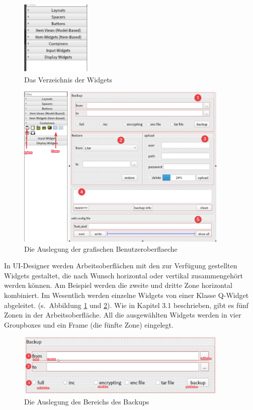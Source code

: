 \begin{figure}[h!]
	\centering
	\includegraphics[width=0.3\textwidth]{bilder/widget.png}
	\caption{Das Verzeichnis der Widgets}
	\label{Abbildung_9}
\end{figure}

\begin{figure}[h!]
	\centering
	\includegraphics[width=0.9\textwidth]{bilder/edit_ui.png}
	\caption{Die Auslegung der grafischen Benutzeroberflaeche}
	\label{Abbildung_10}
\end{figure}

In UI-Designer werden Arbeitsoberflächen mit den zur Verfügung gestellten Widgets gestaltet, die nach Wunsch horizontal oder vertikal zusammengehört werden können. Am Beispiel werden die zweite und dritte Zone horizontal kombiniert. Im Wesentlich werden einzelne Widgets von einer Klasse Q-Widget abgeleitet. (s. Abbildung \ref{Abbildung_9} und \ref{Abbildung_10}).
Wie in Kapitel 3.1 beschrieben, gibt es fünf Zonen in der Arbeitsoberfläche. All die ausgewählten Widgets werden in vier Groupboxes und ein Frame (die fünfte Zone) eingelegt.

\begin{figure}[h!]
	\centering
	\includegraphics[width=0.9\textwidth]{bilder/man_backup.png}
	\caption{Die Auslegung des Bereichs des Backups }
	\label{Abbildung_11}
\end{figure}

